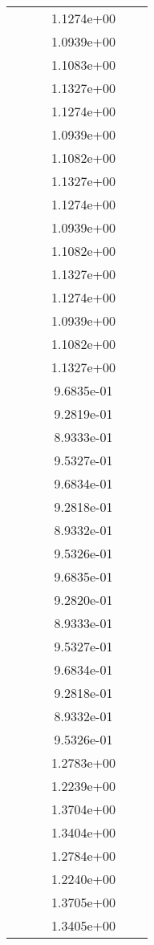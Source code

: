 \begin{xltabular}{\textwidth}{r|rS[table-format=1.3e+2]S[table-format=1.4e+2]S[table-format=1.4e+2]S[table-format=-1.5]}
&  &  & 1.1274e+00 & & \\
&  &  & 1.0939e+00 & & \\
&  &  & 1.1083e+00 & & \\
&  &  & 1.1327e+00 & & \\
&  &  & 1.1274e+00 & & \\
&  &  & 1.0939e+00 & & \\
&  &  & 1.1082e+00 & & \\
&  &  & 1.1327e+00 & & \\
&  &  & 1.1274e+00 & & \\
&  &  & 1.0939e+00 & & \\
&  &  & 1.1082e+00 & & \\
&  &  & 1.1327e+00 & & \\
&  &  & 1.1274e+00 & & \\
&  &  & 1.0939e+00 & & \\
&  &  & 1.1082e+00 & & \\
&  &  & 1.1327e+00 & & \\
&  &  & 9.6835e-01 & & \\
&  &  & 9.2819e-01 & & \\
&  &  & 8.9333e-01 & & \\
&  &  & 9.5327e-01 & & \\
&  &  & 9.6834e-01 & & \\
&  &  & 9.2818e-01 & & \\
&  &  & 8.9332e-01 & & \\
&  &  & 9.5326e-01 & & \\
&  &  & 9.6835e-01 & & \\
&  &  & 9.2820e-01 & & \\
&  &  & 8.9333e-01 & & \\
&  &  & 9.5327e-01 & & \\
&  &  & 9.6834e-01 & & \\
&  &  & 9.2818e-01 & & \\
&  &  & 8.9332e-01 & & \\
&  &  & 9.5326e-01 & & \\
&  &  & 1.2783e+00 & & \\
&  &  & 1.2239e+00 & & \\
&  &  & 1.3704e+00 & & \\
&  &  & 1.3404e+00 & & \\
&  &  & 1.2784e+00 & & \\
&  &  & 1.2240e+00 & & \\
&  &  & 1.3705e+00 & & \\
&  &  & 1.3405e+00 & & \\

\end{xltabular}

